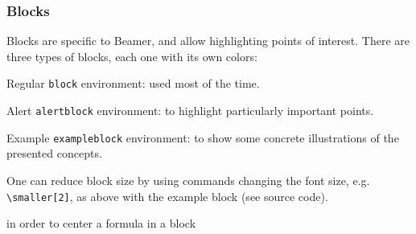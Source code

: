 \documentclass[10pt,    %
    english,            %
    xcolor=table,       %
    envcountsect,       %
    aspectratio=43      %
]{beamer}
\begin{document}
\begin{frame}
    \frametitle{Blocks}
    \label{frm:blocks}
    
    Blocks are specific to Beamer, and allow highlighting points of interest. There are three types of blocks, each one with its own colors:

    \begin{block}{Regular}
        \texttt{block} environment: used most of the time.
    \end{block}

    \begin{alertblock}{Alert}
        \texttt{alertblock} environment: to highlight particularly important points.
    \end{alertblock}

    \begin{exampleblock}{\smaller[2] Example}
        \smaller[2]
        \texttt{exampleblock} environment: to show some concrete illustrations of the presented concepts.
    \end{exampleblock}
    
    One can reduce block size by using commands changing the font size, e.g. \texttt{\textbackslash{}smaller[2]}, as above with the example block (see source code).
    
    in order to center a formula in a block
        
    
    
    
\end{frame}
\end{document}
